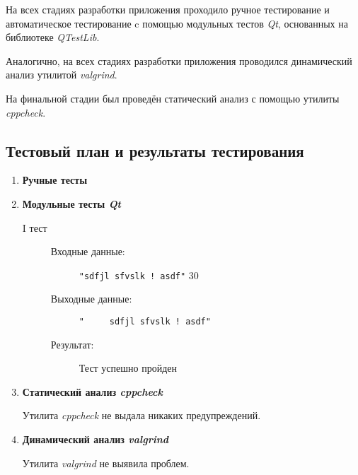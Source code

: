 \documentclass[12pt,a4paper]{report}
\begin{document}
На всех стадиях разработки приложения проходило ручное тестирование и автоматическое тестирование c помощью модульных тестов \textit{Qt}, основанных на библиотеке  \textit{QTestLib}.

Аналогично, на всех стадиях разработки приложения проводился динамический анализ утилитой \textit{valgrind}.

На финальной стадии был проведён статический анализ с помощью утилиты \textit{cppcheck}.
\subsection{Тестовый план и результаты тестирования}
\hspace{\parindent}
\begin{enumerate}
\item \textbf{Ручные тесты}
\begin{flushleft}
\end{flushleft}
\item \textbf{Модульные тесты \textit{Qt}}

\begin{description}
\item[I тест]
\hspace{\parindent}
\begin{flushleft}
\begin{description}
\item[Входные данные:] \verb-"sdfjl sfvslk ! asdf"- 30


\item[Выходные данные:] \verb-"     sdfjl sfvslk ! asdf"-

\item[Результат:] Тест успешно пройден
\end{description}
\end{flushleft}
\end{description}

\item \textbf{Статический анализ \textit{cppcheck}}

Утилита \textit{cppcheck} не выдала никаких предупреждений.

\item \textbf{Динамический анализ \textit{valgrind}}

Утилита \textit{valgrind} не выявила проблем.
\end{enumerate}
\end{document}
